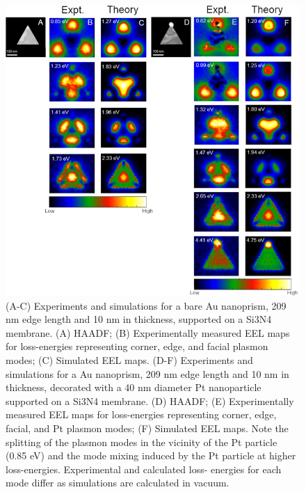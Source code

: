\documentclass [11pt, proquest] {uwthesis}[2016/11/22]
\begin{document}
\begin{figure}
\begin{centering}
\includegraphics{prisms_mode_maps_tip.png}
\caption{(A-C) Experiments and simulations for a bare Au nanoprism, 209 nm edge length and 10 nm in thickness, supported on a Si3N4 membrane. (A) HAADF; (B) Experimentally measured EEL maps for loss-energies representing corner, edge, and facial plasmon modes; (C) Simulated EEL maps. (D-F) Experiments and simulations for a Au nanoprism, 209 nm edge length and 10 nm in thickness, decorated with a 40 nm diameter Pt nanoparticle supported on a Si3N4 membrane. (D) HAADF; (E) Experimentally measured EEL maps for loss-energies representing corner, edge, facial, and Pt plasmon modes; (F) Simulated EEL maps. Note the splitting of the plasmon modes in the vicinity of the Pt particle (0.85 eV) and the mode mixing induced by the Pt particle at higher loss-energies. Experimental and calculated loss- energies for each mode differ as simulations are calculated in vacuum.}
\label{modes_tip}
\end{centering}
\end{figure}
\end{document}
